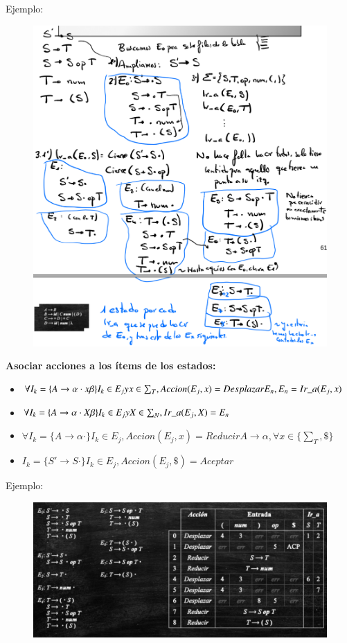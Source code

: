 \documentclass[12pt]{report} %
\begin{document}
Ejemplo: 
\begin{figure}[H]
  {\includegraphics[scale=.3]{2021-03-26 19_23_58-ASintactico.pdf - Foxit Reader.png}}
\end{figure}
\pagebreak
\textbf{Asociar acciones a los ítems de los estados:}
\begin{itemize}
  \item $\forall I_k = \{ A \rightarrow \alpha \cdot x \beta\} I_k \in E_j \space y \space x\in \sum_T, Accion(E_j, x)=Desplazar E_n, E_n = Ir\_a(E_j,x)$
  \item $\forall I_k = \{ A \rightarrow \alpha \cdot X \beta\} I_k \in E_j \space y \space X\in \sum_N, Ir\_a(E_j,X) = E_n$
  \item $\forall I_k = \{ A \rightarrow \alpha \cdot \} I_k \in E_j, Accion(E_j, x)= Reducir A \rightarrow \alpha, \forall x \in \{ \sum_T, \$ \}$
  \item $I_k = \{ S' \rightarrow S \cdot \} I_k \in E_j, Accion(E_j, \$)= Aceptar$
\end{itemize}

Ejemplo: 
\begin{figure}[H]
  {\includegraphics[scale=.35]{2021-03-26 19_51_21-ASintactico.pdf - Foxit Reader.png}}
\end{figure}
\end{document}
